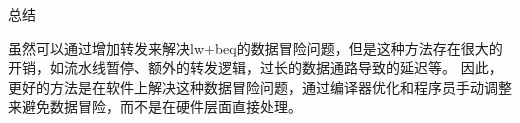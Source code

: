 \documentclass[12pt,hyperref,a4paper,UTF8]{ctexart}
\begin{document}
\Large 总结
\normalsize

虽然可以通过增加转发来解决lw+beq的数据冒险问题，但是这种方法存在很大的开销，如流水线暂停、额外的转发逻辑，过长的数据通路导致的延迟等。
因此，更好的方法是在软件上解决这种数据冒险问题，通过编译器优化和程序员手动调整来避免数据冒险，而不是在硬件层面直接处理。


\end{document}
